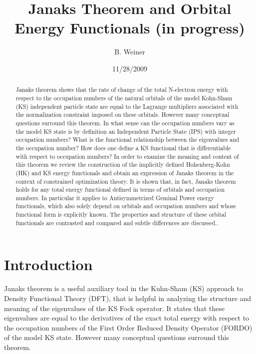 \documentclass[aps,preprint]{revtex4}%
\begin{document}
\preprint{ }
\title[Janaks Theorem]{Janaks Theorem and Orbital Energy Functionals (in progress)}
\author{B. Weiner}
\keywords{}
\pacs{}

\begin{abstract}
Janaks theorem shows that the rate of change of the total N-electron energy
with respect to the occupation numbers of the natural orbitals of the model
Kohn-Sham (KS) independent particle state are equal to the Lagrange
multipliers associated with the normalization constraint imposed on these
orbitals. However many conceptual questions surround this theorem. In what
sense can the occupation numbers vary as the model KS state is by definition
an Independent Particle State (IPS) with integer occupation numbers? What is
the functional relationship between the eigenvalues and the occupation number?
How does one define a KS functional that is differentiable with respect to
occupation numbers? In order to examine the meaning and content of this
theorem we review the construction of the implicitly defined Hohenberg-Kohn
(HK) and KS energy functionals and obtain an expression of Janaks theorem in
the context of constrained optimization theory. It is shown that, in fact,
Janaks theorem holds for any total energy functional defined in terms of
orbitals and occupation numbers. In particular it applies to Antisymmetrized
Geminal Power energy functionals, which also solely depend on orbitals and
occupation numbers and whose functional form is explicitly known. The
properties and structure of these orbital functionals are contrasted and
compared and subtle differences are discussed..\qquad

\end{abstract}
\date{11/28/2009}
\maketitle
\tableofcontents


\section{Introduction\label{Intro}}

Janaks theorem \cite{Janak1978} is a useful auxiliary tool in the Kuhn-Sham
(KS) \cite{KS1965} approach to Density Functional Theory (DFT), that is
helpful in analyzing the structure and meaning of the eigenvalues of the KS
Fock operator. It states that these eigenvalues are equal to the derivatives
of the exact total energy with respect to the occupation numbers of the First
Order Reduced Density Operator (FORDO) of the model KS state. However many
conceptual questions surround this theorem.
\end{document}
